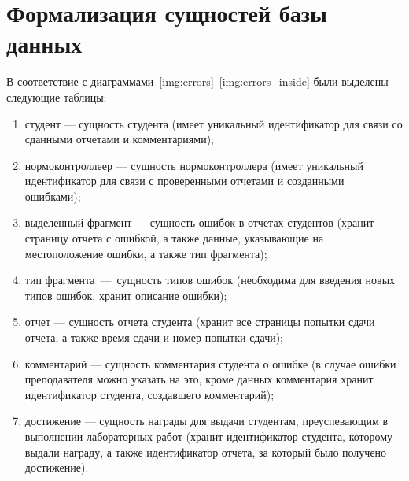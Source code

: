 \section{Формализация сущностей базы данных}

В соответствие с диаграммами~\ref{img:errors}--\ref{img:errors_inside} были выделены следующие таблицы:
\begin{enumerate}
	\item студент --- сущность студента (имеет уникальный идентификатор для связи со сданными отчетами и комментариями);
	\item нормоконтроллеер --- сущность нормоконтроллера (имеет уникальный идентификатор для связи с проверенными отчетами и созданными ошибками);
	\item выделенный фрагмент --- сущность ошибок в отчетах студентов (хранит страницу отчета с ошибкой, а также данные, указывающие на местоположение ошибки, а также тип фрагмента);
	\item тип фрагмента~---~сущность типов ошибок (необходима для введения новых типов ошибок, хранит описание ошибки);
	\item отчет --- сущность отчета студента (хранит все страницы попытки сдачи отчета, а также время сдачи и номер попытки сдачи);
	\item комментарий --- сущность комментария студента о ошибке (в случае ошибки преподавателя можно указать на это, кроме данных комментария хранит идентификатор студента, создавшего комментарий);
	\item достижение --- сущность награды для выдачи студентам, преуспевающим в выполнении лабораторных работ (хранит идентификатор студента, которому выдали награду, а также идентификатор отчета, за который было получено достижение).
\end{enumerate}

